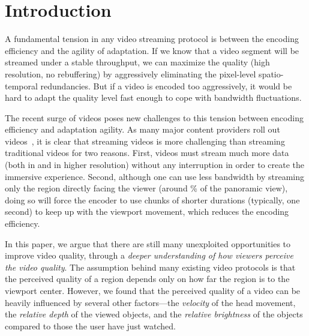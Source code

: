 
\section{Introduction}


A fundamental tension in any video streaming protocol is between the encoding efficiency and the agility of adaptation.
If we know that a video segment will be streamed under a stable throughput, we can maximize the quality (\eg high resolution, no rebuffering) by aggressively eliminating the pixel-level spatio-temporal redundancies.
But if a video is encoded too aggressively, it would be hard to adapt the quality level fast enough to cope with bandwidth fluctuations.


The recent surge of \vr videos poses new challenges to this tension between encoding efficiency and adaptation agility. 
As many major content providers roll out \vr videos~\cite{??,??,??,??,??}, 
it is clear that streaming \vr videos is more challenging than streaming traditional videos for two reasons.
First, \vr videos must stream much more data (both in \vr and in higher resolution) without any interruption in order to create the immersive experience.
Second, although one can use less bandwidth by streaming only the region directly facing the viewer (around \fillme\% of the panoramic view), doing so will force the encoder to use chunks of shorter durations (typically, one second) to keep up with the viewport movement, which reduces the encoding efficiency.


In this paper, we argue that there are still many unexploited opportunities to improve \vr video quality, through a {\em deeper understanding of how viewers perceive the \vr video quality}.
The assumption behind many existing \vr video protocols is that the perceived quality of a region depends only on how far the region is to the viewport center.
However, we found that the perceived quality of a \vr video can be heavily influenced by several other factors---the {\em velocity} of the head movement, the {\em relative depth} of the viewed objects, and the {\em relative brightness} of the objects compared to those the user have just watched. 

